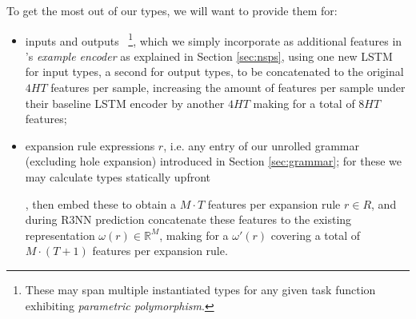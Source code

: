 \documentclass{article}
\begin{document}
To get the most out of our types, we will want to provide them for:
\begin{itemize}
    \item inputs and outputs%
    ~\footnote{
        These may span multiple instantiated types for any given task function exhibiting \emph{parametric polymorphism}.
    },
    which we simply incorporate as additional features in \citet{nsps}'s
    \emph{example encoder} as explained in Section \ref{sec:nsps},
    using one new LSTM for input types, a second for output types,
    to be concatenated to the original $4HT$ features per sample,
    increasing the amount of features per sample under their baseline
    LSTM encoder by another $4HT$ making for a total of $8HT$ features;

    \item expansion rule expressions $r$, i.e. any entry of our unrolled grammar
    (excluding hole expansion) introduced in Section \ref{sec:grammar};
    for these we may calculate types statically upfront%


,
    then embed these to obtain a $M \cdot T$ features per expansion rule $r \in R$,
    and during R3NN prediction concatenate these features to the existing
    representation $\omega(r) \in \mathbb{R}^M$,
    making for a $\omega'(r)$ covering a total of $M \cdot (T+1)$ features per expansion rule.


\end{itemize}
\end{document}

